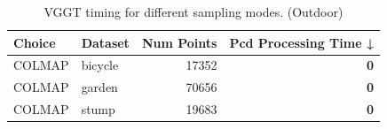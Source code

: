 \begin{table}[H]
\caption{\ifdefined\customcaption \customcaption \else VGGT timing for different sampling modes. (Outdoor) \fi}
\label{tab:01_sampling_mode_timing_outdoor}
\centering
\scriptsize
\begin{tabular}{llrr}
\toprule
Choice & Dataset & Num Points & Pcd Processing Time ↓ \\
\midrule
COLMAP & bicycle & 17352 & \textbf{0} \\
\midrule
COLMAP & garden & 70656 & \textbf{0} \\
\midrule
COLMAP & stump & 19683 & \textbf{0} \\
\bottomrule
\end{tabular}
\end{table}